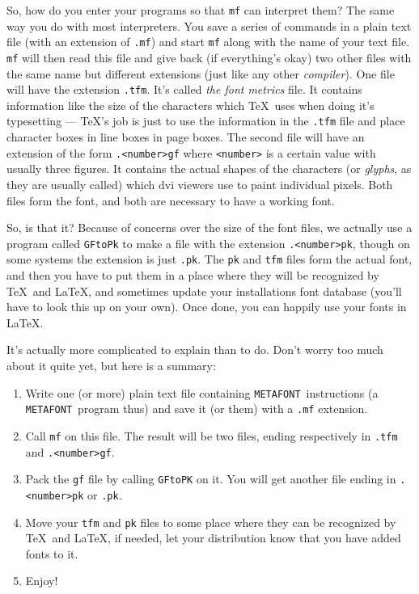 \documentclass[a4paper,11pt,twoside]{book}
\newcommand{\MF}{{\tt METAFONT}}
\begin{document}
So, how do you enter your programs so that \texttt{mf} can interpret them?
The same way you do with most interpreters.
You save a series of commands in a plain text file (with an extension of \texttt{.mf}) and start
\texttt{mf} along with the name of your text file.
\texttt{mf} will then read this file and give back (if everything's okay) two other files with
the same name but different extensions (just like any other \emph{compiler}).
One file will have the extension \texttt{.tfm}.
It's called \emph{the font metrics} file.
It contains information like the size of the characters which \TeX\ uses when doing it's
typesetting --- \TeX's job is just to use the information in the \texttt{.tfm} file and place
character boxes in line boxes in page boxes.
The second file will have an extension of the form \texttt{.<number>gf} where \texttt{<number>}
is a certain value with usually three figures.
It contains the actual shapes of the characters (or \emph{glyphs}, as they are usually called)
which dvi viewers use to paint individual pixels.
Both files form the font, and both are necessary to have a working font.

So, is that it?
Because of concerns over the size of the font files, we actually use a program called
\texttt{GFtoPk} to make a file with the extension \texttt{.<number>pk}, though on some systems
the extension is just \texttt{.pk}.
The \texttt{pk} and \texttt{tfm} files form the actual font, and then you have to put them in a
place where they will be recognized by \TeX\ and \LaTeX, and sometimes update your installations
font database (you'll have to look this up on your own).
Once done, you can happily use your fonts in \LaTeX.

It's actually more complicated to explain than to do.
Don't worry too much about it quite yet, but here is a summary:
\begin{enumerate}
\item Write one (or more) plain text file containing \MF\ instructions (a \MF\ program thus) and
save it (or them) with a \texttt{.mf} extension.
\item Call \texttt{mf} on this file.
The result will be two files, ending respectively in \texttt{.tfm} and \texttt{.<number>gf}.
\item Pack the \texttt{gf} file by calling \texttt{GFtoPK} on it.
You will get another file ending in \texttt{.<number>pk} or \texttt{.pk}.
\item Move your \texttt{tfm} and \texttt{pk} files to some place where they can be recognized
by \TeX\ and \LaTeX, if needed, let your distribution know that you have added fonts to it.
\item Enjoy!
\end{enumerate}
\end{document}
